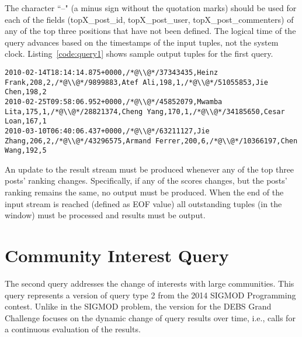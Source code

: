 \documentclass{sig-alternate}
\begin{document}
The character ``--" (a minus sign without the quotation marks) should be used for each of the fields (topX\_post\_id, topX\_post\_user, topX\_post\_commenters) of any of the top three positions that have not been defined. The logical time of the query advances based on the timestamps of the input tuples, not the system clock. Listing~\ref{code:query1} shows sample output tuples for the first query.

\begin{lstlisting}[float=ht,caption={Output example for the three top scoring posts query},label={code:query1}]
2010-02-14T18:14:14.875+0000,/*@\\@*/37343435,Heinz Frank,208,2,/*@\\@*/9899883,Atef Ali,198,1,/*@\\@*/51055853,Jie Chen,198,2
2010-02-25T09:58:06.952+0000,/*@\\@*/45852079,Mwamba Lita,175,1,/*@\\@*/28821374,Cheng Yang,170,1,/*@\\@*/34185650,Cesar Loan,167,1
2010-03-10T06:40:06.437+0000,/*@\\@*/63211127,Jie Zhang,206,2,/*@\\@*/43296575,Armand Ferrer,200,6,/*@\\@*/10366197,Chen Wang,192,5
\end{lstlisting}

An update to the result stream must be produced whenever any of the top three posts' ranking changes. Specifically, if any of the scores changes, but the posts' ranking remains the same, no output must be produced. When the end of the input stream is reached (defined as EOF value) all outstanding tuples (in the window) must be processed and results must be output. 

\section{Community Interest Query}
\label{sec:query2}
The second query addresses the change of interests with large communities. This query represents a version of query type 2 from the 2014 SIGMOD Programming contest. Unlike in the SIGMOD problem, the version for the DEBS Grand Challenge focuses on the dynamic change of query results over time, i.e., calls for a continuous evaluation of the results. 
\end{document}
